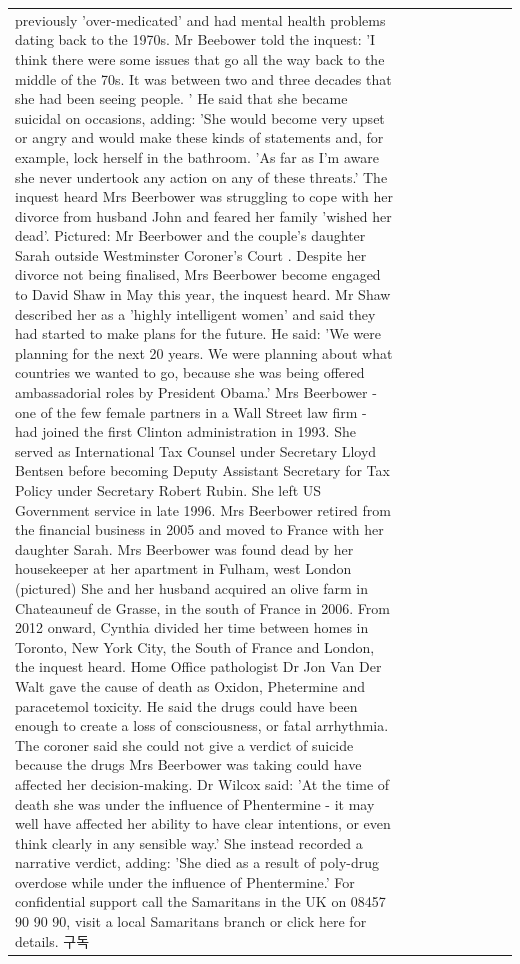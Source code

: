 \begin{table}[H]
\begin{tabular}{lllrlllll}
previously 'over-medicated' and had mental health problems dating back to the 1970s. Mr Beebower told the inquest: 'I think there were some issues that go all the way back to the middle of the 70s. It was between two and three decades that she had been seeing people. ' He said that she became suicidal on occasions, adding: 'She would become very upset or angry and would make these kinds of statements and, for example, lock herself in the bathroom. 'As far as I'm aware she never undertook any action on any of these threats.' The inquest heard Mrs Beerbower was struggling to cope with her divorce from husband John and feared her family 'wished her dead'. Pictured: Mr Beerbower and the couple's daughter Sarah outside Westminster Coroner's Court . Despite her divorce not being finalised, Mrs Beerbower become engaged to David Shaw in May this year, the inquest heard. Mr Shaw described her as a 'highly intelligent women' and said they had started to make plans for the future. He said: 'We were planning for the next 20 years. We were planning about what countries we wanted to go, because she was being offered ambassadorial roles by President Obama.' Mrs Beerbower - one of the few female partners in a Wall Street law firm - had joined the first Clinton administration in 1993. She served as International Tax Counsel under Secretary Lloyd Bentsen before becoming Deputy Assistant Secretary for Tax Policy under Secretary Robert Rubin. She left US Government service in late 1996. Mrs Beerbower retired from the financial business in 2005 and moved to France with her daughter Sarah. Mrs Beerbower was found dead by her housekeeper at her apartment in Fulham, west London (pictured) She and her husband acquired an olive farm in Chateauneuf de Grasse, in the south of France in 2006. From 2012 onward, Cynthia divided her time between homes in Toronto, New York City, the South of France and London, the inquest heard. Home Office pathologist Dr Jon Van Der Walt gave the cause of death as Oxidon, Phetermine and paracetemol toxicity. He said the drugs could have been enough to create a loss of consciousness, or fatal arrhythmia. The coroner said she could not give a verdict of suicide because the drugs Mrs Beerbower was taking could have affected her decision-making. Dr Wilcox said: 'At the time of death she was under the influence of Phentermine - it may well have affected her ability to have clear intentions, or even think clearly in any sensible way.' She instead recorded a narrative verdict, adding: 'She died as a result of poly-drug overdose while under the influence of Phentermine.' For confidential support call the Samaritans in the UK on 08457 90 90 90, visit a local Samaritans branch or click here for details. 구독 \\

\end{tabular}
\end{table}
